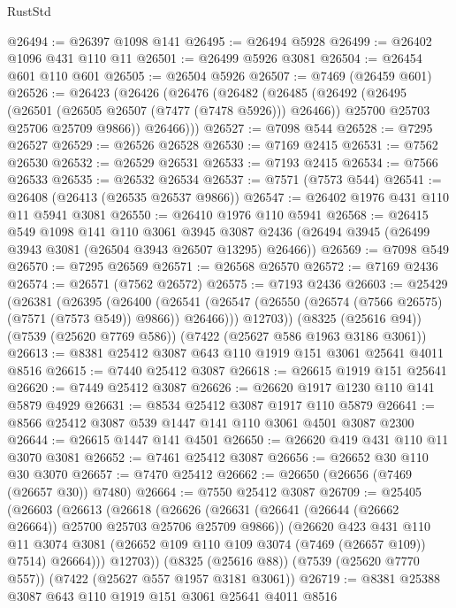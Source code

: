 \begin{lexlean}{RustStd}
\begin{coremodule}
@26494 := @26397 @1098 @141
@26495 := @26494 @5928
@26499 := @26402 @1096 @431 @110 @11
@26501 := @26499 @5926 @3081
@26504 := @26454 @601 @110 @601
@26505 := @26504 @5926
@26507 := @7469 (@26459 @601)
@26526 := @26423
    (@26426
      (@26476
        (@26482
          (@26485
            (@26492
              (@26495 (@26501 (@26505 @26507 (@7477 (@7478 @5926))) @26466))
              @25700
              @25703
              @25706
              @25709
              @9866))
          @26466)))
@26527 := @7098 @544
@26528 := @7295 @26527
@26529 := @26526 @26528
@26530 := @7169 @2415
@26531 := @7562 @26530
@26532 := @26529 @26531
@26533 := @7193 @2415
@26534 := @7566 @26533
@26535 := @26532 @26534
@26537 := @7571 (@7573 @544)
@26541 := @26408 (@26413 (@26535 @26537 @9866))
@26547 := @26402 @1976 @431 @110 @11 @5941 @3081
@26550 := @26410 @1976 @110 @5941
@26568 := @26415
    @549
    @1098
    @141
    @110
    @3061
    @3945
    @3087
    @2436
    (@26494 @3945 (@26499 @3943 @3081 (@26504 @3943 @26507 @13295) @26466))
@26569 := @7098 @549
@26570 := @7295 @26569
@26571 := @26568 @26570
@26572 := @7169 @2436
@26574 := @26571 (@7562 @26572)
@26575 := @7193 @2436
@26603 := @25429
    (@26381
      (@26395
        (@26400
          (@26541 (@26547 (@26550 (@26574 (@7566 @26575) (@7571 (@7573 @549)) @9866)) @26466)))
        @12703))
    (@8325 (@25616 @94))
    (@7539 (@25620 @7769 @586))
    (@7422 (@25627 @586 @1963 @3186 @3061))
@26613 := @8381 @25412 @3087 @643 @110 @1919 @151 @3061 @25641 @4011 @8516
@26615 := @7440 @25412 @3087
@26618 := @26615 @1919 @151 @25641
@26620 := @7449 @25412 @3087
@26626 := @26620 @1917 @1230 @110 @141 @5879 @4929
@26631 := @8534 @25412 @3087 @1917 @110 @5879
@26641 := @8566 @25412 @3087 @539 @1447 @141 @110 @3061 @4501 @3087 @2300
@26644 := @26615 @1447 @141 @4501
@26650 := @26620 @419 @431 @110 @11 @3070 @3081
@26652 := @7461 @25412 @3087
@26656 := @26652 @30 @110 @30 @3070
@26657 := @7470 @25412
@26662 := @26650 (@26656 (@7469 (@26657 @30)) @7480)
@26664 := @7550 @25412 @3087
@26709 := @25405
    (@26603
      (@26613
        (@26618
          (@26626
            (@26631 (@26641 (@26644 (@26662 @26664)) @25700 @25703 @25706 @25709 @9866))
            (@26620
              @423
              @431
              @110
              @11
              @3074
              @3081
              (@26652 @109 @110 @109 @3074 (@7469 (@26657 @109)) @7514)
              @26664)))
        @12703))
    (@8325 (@25616 @88))
    (@7539 (@25620 @7770 @557))
    (@7422 (@25627 @557 @1957 @3181 @3061))
@26719 := @8381 @25388 @3087 @643 @110 @1919 @151 @3061 @25641 @4011 @8516

\end{coremodule}
\end{lexlean}
